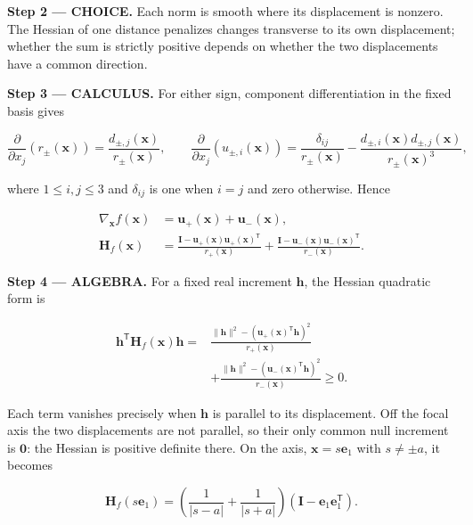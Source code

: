 \documentclass[11pt,oneside,openany]{book}
\begin{document}
\begin{ChoiceStep}
\textbf{Step 2 --- CHOICE.} Each norm is smooth where its displacement is nonzero. The Hessian of one distance penalizes changes transverse to its own displacement; whether the sum is strictly positive depends on whether the two displacements have a common direction.

\end{ChoiceStep}
\textbf{Step 3 --- CALCULUS.} For either sign, component differentiation in the fixed basis gives

\[
\frac{\partial}{\partial x_j}\left(r_\pm(\mathbf x)\right)
=\frac{d_{\pm,j}(\mathbf x)}{r_\pm(\mathbf x)},\qquad
\frac{\partial}{\partial x_j}\left(u_{\pm,i}(\mathbf x)\right)
=\frac{\delta_{ij}}{r_\pm(\mathbf x)}
-\frac{d_{\pm,i}(\mathbf x)d_{\pm,j}(\mathbf x)}{r_\pm(\mathbf x)^3},
\]

where \(1\le i,j\le3\) and \(\delta_{ij}\) is one when \(i=j\) and zero otherwise. Hence

\[
\begin{aligned}
\nabla_{\mathbf x}f(\mathbf x)&=\mathbf u_+(\mathbf x)+\mathbf u_-(\mathbf x),\\
\mathbf H_f(\mathbf x)
&=\frac{\mathbf I-\mathbf u_+(\mathbf x)\mathbf u_+(\mathbf x)^{\mathsf T}}{r_+(\mathbf x)}
+\frac{\mathbf I-\mathbf u_-(\mathbf x)\mathbf u_-(\mathbf x)^{\mathsf T}}{r_-(\mathbf x)}.
\end{aligned}
\]

\begingroup\color{AlgebraBlue}
\textbf{Step 4 --- ALGEBRA.} For a fixed real increment \(\mathbf h\), the Hessian quadratic form is

\[
\begin{aligned}
\mathbf h^{\mathsf T}\mathbf H_f(\mathbf x)\mathbf h
={}&\frac{\|\mathbf h\|^2-(\mathbf u_+(\mathbf x)^{\mathsf T}\mathbf h)^2}{r_+(\mathbf x)}\\
&+\frac{\|\mathbf h\|^2-(\mathbf u_-(\mathbf x)^{\mathsf T}\mathbf h)^2}{r_-(\mathbf x)}\ge0.
\end{aligned}
\]

Each term vanishes precisely when \(\mathbf h\) is parallel to its displacement. Off the focal axis the two displacements are not parallel, so their only common null increment is \(\mathbf0\): the Hessian is positive definite there. On the axis, \(\mathbf x=s\mathbf e_1\) with \(s\ne\pm a\), it becomes

\[
\mathbf H_f(s\mathbf e_1)
=\left(\frac1{|s-a|}+\frac1{|s+a|}\right)
(\mathbf I-\mathbf e_1\mathbf e_1^{\mathsf T}).
\]
\end{document}
